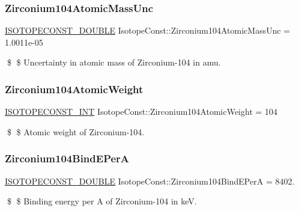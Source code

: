 \subsubsection{\texorpdfstring{Zirconium104\+Atomic\+Mass\+Unc}{Zirconium104AtomicMassUnc}}
{\footnotesize\ttfamily \mbox{\hyperlink{group___isotope_const-_macros_ga8f45a7272ce02c0b4c65c44636ed719a}{I\+S\+O\+T\+O\+P\+E\+C\+O\+N\+S\+T\+\_\+\+D\+O\+U\+B\+LE}} Isotope\+Const\+::\+Zirconium104\+Atomic\+Mass\+Unc = 1.\+0011e-\/05}

\$ \$ Uncertainty in atomic mass of Zirconium-\/104 in amu. \mbox{\label{group___isotope_const-_zirconium-_zr104_gaa442cff5913443b8af681d1e2edb2a15}} 
\subsubsection{\texorpdfstring{Zirconium104\+Atomic\+Weight}{Zirconium104AtomicWeight}}
{\footnotesize\ttfamily \mbox{\hyperlink{group___isotope_const-_macros_ga5f18360b3e99483a35c32d789e62621c}{I\+S\+O\+T\+O\+P\+E\+C\+O\+N\+S\+T\+\_\+\+I\+NT}} Isotope\+Const\+::\+Zirconium104\+Atomic\+Weight = 104}

\$ \$ Atomic weight of Zirconium-\/104. \mbox{\label{group___isotope_const-_zirconium-_zr104_gae0bc22595e1a77b2a3aeb351fced4ccf}} 
\subsubsection{\texorpdfstring{Zirconium104\+Bind\+E\+PerA}{Zirconium104BindEPerA}}
{\footnotesize\ttfamily \mbox{\hyperlink{group___isotope_const-_macros_ga8f45a7272ce02c0b4c65c44636ed719a}{I\+S\+O\+T\+O\+P\+E\+C\+O\+N\+S\+T\+\_\+\+D\+O\+U\+B\+LE}} Isotope\+Const\+::\+Zirconium104\+Bind\+E\+PerA = 8402.}

\$ \$ Binding energy per A of Zirconium-\/104 in keV. \mbox{\label{group___isotope_const-_zirconium-_zr104_ga5486c96b5658a86105857937d31eb407}} 
